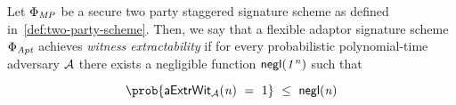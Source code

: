 \begin{definition} 
	
Let $\Phi_{\mathit{MP}}$ be a secure two party staggered signature scheme as defined in~\cref{def:two-party-scheme}. Then, we say that a flexible adaptor signature scheme $\Phi_{\mathit{Apt}}$ achieves \emph{witness extractability} if for every probabilistic polynomial-time adversary $\mathcal{A}$ there exists a negligible function $\mathsf{negl}(\mathit{1^n})$ such that 

	 \[ \prob{\procExpExt{\varN} \opEqNoQ 1} \opSmEq \funNegl{\varN} \]
	
    \begin{center}
        \fbox{
        \begin{varwidth}{\textwidth}
            \procedure[linenumbering]{$\procExpExt{\varN}$} {
            ((\varSecKeyAlice, \varPubKeyAlice), (\varSecKeyBob, \varPubKeyBob)) \opFunResult \procKeyGenPt{\varSecParam}{\varSecParam} \\
            (\varMsg \opSeperate \varStatement) \opFunResult \cnstAdversary^{\procSignOracle{\cdot}{\cdot}}(\varPubKeyAlice, \varPubKeyBob, \varSecKeyBob) \\
            (\varSigAlice \opSeperate \varSigBob)\opFunResult \procSignPt{\varMsg}{\varSecKeyAlice}{\varSecKeyBob} \\
            (\varSigAptBob \opSeperate \varSigFin) \opFunResult \cnstAdversary^{\procSignOracle{\cdot}{\cdot}}(\varSigAlice) \\
            \funStar{\varWit} \opFunResult \procExtWit{\varSigFin}{\varSigAlice}{\varSigAptBob} \\
            \pcreturn ((\varStatement \opSeperate \funStar{\varWit}) \opNotIn \cnstRelation \opAnd \procVerFinSig(\varSigFin, \varMsg, \varPubKeyAlice, \varPubKeyBob))
            }\\

            \procedure[linenumbering]{$\procSignOracle{\varMsg}{\varPubKey}$} {
            \varSet \opAssign \varSet \opUnion \varMsg \\
            (\varSigAlice \opSeperate \varSigBob) \opFunResult \procSignPt{\varMsg}{\varSecKeyAlice}{\varSecKeyBob} \\
            \pcreturn  (\varSigAlice \opSeperate \varSigBob)
            }
        \end{varwidth}
        }
    \end{center}
\end{definition}





































